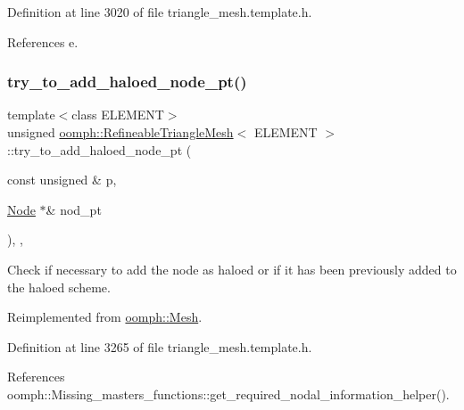 Definition at line 3020 of file triangle\+\_\+mesh.\+template.\+h.



References e.

\mbox{\label{classoomph_1_1RefineableTriangleMesh_a0bc1283a0cf4ea45abefea1930ef748a}} 
\subsubsection{\texorpdfstring{try\+\_\+to\+\_\+add\+\_\+haloed\+\_\+node\+\_\+pt()}{try\_to\_add\_haloed\_node\_pt()}}
{\footnotesize\ttfamily template$<$class E\+L\+E\+M\+E\+NT$>$ \\
unsigned \hyperlink{classoomph_1_1RefineableTriangleMesh}{oomph\+::\+Refineable\+Triangle\+Mesh}$<$ E\+L\+E\+M\+E\+NT $>$\+::try\+\_\+to\+\_\+add\+\_\+haloed\+\_\+node\+\_\+pt (\begin{DoxyParamCaption}\item[{const unsigned \&}]{p,  }\item[{\hyperlink{classoomph_1_1Node}{Node} $\ast$\&}]{nod\+\_\+pt }\end{DoxyParamCaption})\hspace{0.3cm}{\ttfamily [inline]}, {\ttfamily [protected]}, {\ttfamily [virtual]}}



Check if necessary to add the node as haloed or if it has been previously added to the haloed scheme. 



Reimplemented from \hyperlink{classoomph_1_1Mesh_a261da18d83f808fdf62b8f3c127266b1}{oomph\+::\+Mesh}.



Definition at line 3265 of file triangle\+\_\+mesh.\+template.\+h.



References oomph\+::\+Missing\+\_\+masters\+\_\+functions\+::get\+\_\+required\+\_\+nodal\+\_\+information\+\_\+helper().

\mbox{\label{classoomph_1_1RefineableTriangleMesh_a74ffc2a74516677536fa41d0c1d957ad}} 
